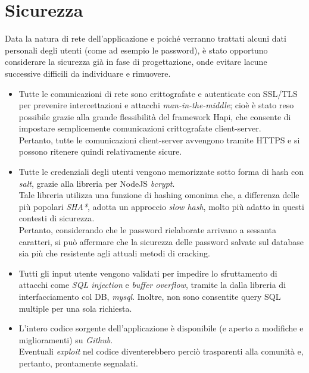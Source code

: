 \documentclass[11pt]{report}
\begin{document}
\pagebreak
\section{Sicurezza}
Data la natura di rete dell'applicazione e poiché verranno trattati alcuni dati personali degli utenti (come ad esempio le password), è stato opportuno considerare la sicurezza già in fase di progettazione, onde evitare lacune successive difficili da individuare e rimuovere.
\begin{itemize}
	\item Tutte le comunicazioni di rete sono crittografate e autenticate con SSL/TLS per prevenire intercettazioni e attacchi \textit{man-in-the-middle}; cioè è stato reso possibile grazie alla grande flessibilità del framework Hapi, che consente di impostare semplicemente comunicazioni crittografate client-server.
	\\Pertanto, tutte le comunicazioni client-server avvengono tramite HTTPS e si possono ritenere quindi relativamente sicure.
	\item Tutte le credenziali degli utenti vengono memorizzate sotto forma di hash con \textit{salt}, grazie alla libreria per NodeJS \textit{bcrypt}.
	\\Tale libreria utilizza una funzione di hashing omonima che, a differenza delle più popolari \textit{SHA*}, adotta un approccio \textit{slow hash}, molto più adatto in questi contesti di sicurezza.
	\\Pertanto, considerando che le password rielaborate arrivano a sessanta caratteri, si può affermare che la sicurezza delle password salvate sul database sia più che resistente agli attuali metodi di cracking.
	\item Tutti gli input utente vengono validati per impedire lo sfruttamento di attacchi come \textit{SQL injection} e \textit{buffer overflow}, tramite la dalla libreria di interfacciamento col DB, \textit{mysql}. Inoltre, non sono consentite query SQL multiple per una sola richiesta.
	\item L'intero codice sorgente dell'applicazione è disponibile (e aperto a modifiche e miglioramenti) su \textit{Github}.
	\\Eventuali \textit{exploit} nel codice diventerebbero perciò trasparenti alla comunità e, pertanto, prontamente segnalati.
\end{itemize}
\pagebreak
\end{document}
